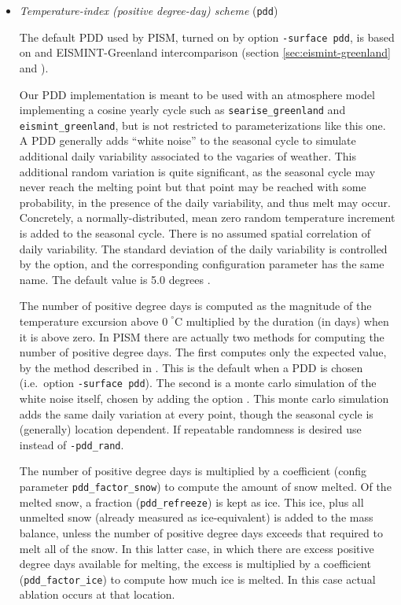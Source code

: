 \begin{itemize}
 \item \emph{Temperature-index (positive degree-day) scheme} (\texttt{pdd})     

   The default PDD used by PISM, turned on by option \texttt{-surface pdd}, is based on \cite{CalovGreve05} and EISMINT-Greenland intercomparison (section \ref{sec:eismint-greenland} and \cite{RitzEISMINT}).

   Our PDD implementation is meant to be used with an atmosphere model implementing a cosine yearly cycle such as \texttt{searise_greenland} and \texttt{eismint_greenland}, but is not restricted to parameterizations like this one.  A PDD generally adds ``white noise'' to the seasonal cycle to simulate additional daily variability associated to the vagaries of weather.  This additional random variation is quite significant, as the seasonal cycle may never reach the melting point but that point may be reached with some probability, in the presence of the daily variability, and thus melt may occur.  Concretely, a normally-distributed, mean zero random temperature increment is added to the seasonal cycle.  There is no assumed spatial correlation of daily variability.  The standard deviation of the daily variability is controlled by the  option, and the corresponding configuration parameter has the same name.  The default value is 5.0 degrees \cite{RitzEISMINT}.

The number of positive degree days is computed as the magnitude of the temperature excursion above $0\!\phantom{|}^\circ \text{C}$ multiplied by the duration (in days) when it is above zero.  In PISM there are actually two methods for computing the number of positive degree days.  The first computes only the expected value, by the method described in \cite{CalovGreve05}.  This is the default when a PDD is chosen (i.e.~option \texttt{-surface pdd}).  The second is a monte carlo simulation of the white noise itself, chosen by adding the option .  This monte carlo simulation adds the same daily variation at every point, though the seasonal cycle is (generally) location dependent.  If repeatable randomness is desired use  instead of \texttt{-pdd_rand}.

The number of positive degree days is multiplied by a coefficient (config parameter \texttt{pdd_factor_snow}) to compute the amount of snow melted.  Of the melted snow, a fraction (\texttt{pdd_refreeze}) is kept as ice.  This ice, plus all unmelted snow (already measured as ice-equivalent) is added to the mass balance, unless the number of positive degree days exceeds that required to melt all of the snow.  In this latter case, in which there are excess positive degree days available for melting, the excess is multiplied by a coefficient (\texttt{pdd_factor_ice}) to compute how much ice is melted.  In this case actual ablation occurs at that location.


\end{itemize}
